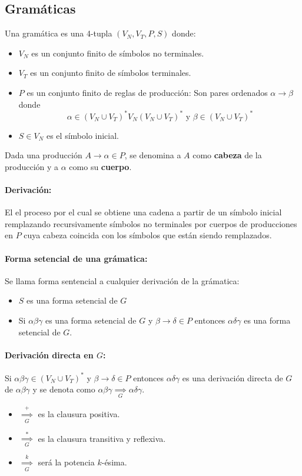 \subsection{Gramáticas}
Una gramática es una 4-tupla \((V_N,V_T,P,S)\) donde:
\begin{itemize}
  \item \(V_N\) es un conjunto finito de símbolos no terminales.
  \item \(V_T\) es un conjunto finito de símbolos terminales.
  \item \(P\) es un conjunto finito de reglas de producción: Son pares ordenados \(\alpha\to \beta\) donde \[\alpha\in(V_N\cup V_T)^*V_N(V_N\cup V_T)^*\text{ y }\beta\in(V_N\cup V_T)^*\]
  \item \(S\in V_N\) es el símbolo inicial.
\end{itemize}

Dada una producción \(A\to\alpha\in P\), se denomina a \(A\) como \textbf{cabeza} de la producción y a \(\alpha\) como su \textbf{cuerpo}.

\paragraph{Derivación:} El el proceso por el cual se obtiene una cadena a partir de un símbolo inicial remplazando recursivamente símbolos no terminales por cuerpos de producciones en \(P\) cuya cabeza coincida con los símbolos que están siendo remplazados.

\paragraph{Forma setencial de una grámatica:} Se llama forma sentencial a cualquier derivación de la grámatica:
\begin{itemize}
  \item \(S\) es una forma setencial de \(G\)
  \item Si \(\alpha\beta\gamma\) es una forma setencial de \(G\) y \(\beta\to\delta\in P\) entonces \(\alpha\delta\gamma\) es una forma setencial de \(G\).
\end{itemize}

\paragraph{Derivación directa en \(G\):} Si \(\alpha\beta\gamma\in(V_N\cup V_T)^*\) y \(\beta\to\delta\in P\) entonces \(\alpha\delta\gamma\) es una derivación directa de \(G\) de \(\alpha\beta\gamma\) y se denota como \(\alpha\beta\gamma\underset{G}{\implies}\alpha\delta\gamma\).
\begin{itemize}
  \item \(\overset{+}{\underset{G}{\implies}}\) es la clausura positiva.
  \item \(\overset{*}{\underset{G}{\implies}}\) es la clausura transitiva y reflexiva.
  \item \(\overset{k}{\underset{G}{\implies}}\) será la potencia \(k\)-ésima.
\end{itemize}

